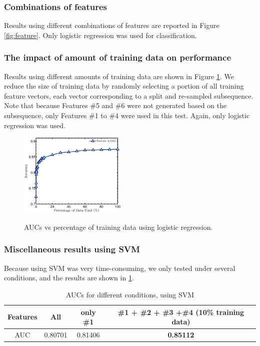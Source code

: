 \documentclass{article} %
\begin{document}
\subsubsection{Combinations of features} %
\label{ssub:combinations_of_features}
Results using different combinations of features are reported in Figure \ref{fig:feature}. Only logistic regression was used for classification.



\subsubsection{The impact of amount of training data on performance} %
\label{ssub:the_impact_of_amount_of_training_data_on_performance}
Results using different amounts of training data are shown in Figure \ref{fig:percentage}. We reduce the size of training data by randomly selecting a portion of all training feature vectors, each vector corresponding to a split and re-sampled subsequence. Note that because Features \#5 and \#6 were not generated based on the subsequence, only Features \#1 to \#4 were used in this test. Again, only logistic regression was used.

\begin{figure}
    \centering
    \includegraphics[height=40mm]{fig/percentage.eps}\\
    \caption{AUCs vs percentage of training data using logistic regression.}
    \label{fig:percentage}
 \end{figure}

\subsubsection{Miscellaneous results using SVM}  %
\label{subs:miscellaneous}
Because using SVM was very time-consuming, we only tested under several conditions, and the results are shown in \ref{tbl:test_result_SVM}.

\begin{table}[!ht]
\caption{AUCs for different conditions, using SVM}
\label{tbl:test_result_SVM}
    \begin{center}
        \begin{tabular}{ c | c  c  c  }
            \hline
             Features & All & only \#1 & \#1 + \#2 + \#3 +\#4 (10\% training data) \\
             \hline
             AUC & 0.80701 & 0.81406 & \textbf{0.85112} \\
             \hline
        \end{tabular}
    \end{center}
\end{table}
\end{document}
